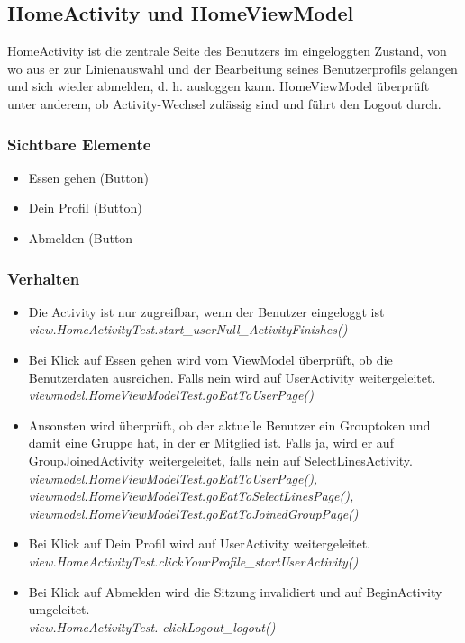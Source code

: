 \documentclass[a4paper]{scrreprt}
\begin{document}
\subsection{HomeActivity und HomeViewModel}
HomeActivity ist die zentrale Seite des Benutzers im eingeloggten Zustand, von wo aus er zur Linienauswahl und der Bearbeitung seines Benutzerprofils gelangen und sich wieder abmelden, d. h. ausloggen kann. HomeViewModel überprüft unter anderem, ob Activity-Wechsel zulässig sind und führt den Logout durch.

\subsubsection{Sichtbare Elemente}

\begin{itemize}
\item Essen gehen (Button)
\item Dein Profil (Button)
\item Abmelden (Button
\end{itemize}

\subsubsection{Verhalten}
\begin{itemize}
\item Die Activity ist nur zugreifbar, wenn der Benutzer eingeloggt ist \\
\textit{view.HomeActivityTest.start\_userNull\_ActivityFinishes()}
\item Bei Klick auf Essen gehen wird vom ViewModel überprüft, ob die Benutzerdaten ausreichen. Falls nein wird auf UserActivity weitergeleitet. \\
\textit{viewmodel.HomeViewModelTest.goEatToUserPage()}
\item Ansonsten wird überprüft, ob der aktuelle Benutzer ein Grouptoken und damit eine Gruppe hat, in der er Mitglied ist. Falls ja, wird er auf GroupJoinedActivity weitergeleitet, falls nein auf SelectLinesActivity. \\
\textit{viewmodel.HomeViewModelTest.goEatToUserPage(), viewmodel.HomeViewModelTest.goEatToSelectLinesPage(), viewmodel.HomeViewModelTest.goEatToJoinedGroupPage()}
\item Bei Klick auf Dein Profil wird auf UserActivity weitergeleitet.\\
\textit{view.HomeActivityTest.clickYourProfile\_startUserActivity()}
\item Bei Klick auf Abmelden wird die Sitzung invalidiert und auf BeginActivity umgeleitet.\\
\textit{view.HomeActivityTest. clickLogout\_logout()}

\end{itemize}
\end{document}
